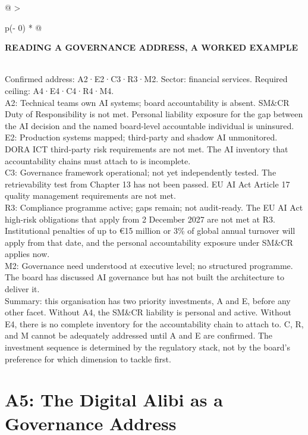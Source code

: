 \begin{longtable}[]{@{}
  >{\raggedright\arraybackslash}p{(\columnwidth - 0\tabcolsep) * }@{}}
\toprule\noalign{}
\begin{minipage}[b]{\linewidth}\raggedright
\textbf{READING A GOVERNANCE ADDRESS, A WORKED EXAMPLE}
\end{minipage} \\
\midrule\noalign{}
\endhead
\bottomrule\noalign{}
\endlastfoot
Confirmed address: A2·E2·C3·R3·M2. Sector: financial services. Required ceiling: A4·E4·C4·R4·M4. \\
A2: Technical teams own AI systems; board accountability is absent. SM\&CR Duty of Responsibility is not met. Personal liability exposure for the gap between the AI decision and the named board-level accountable individual is uninsured. \\
E2: Production systems mapped; third-party and shadow AI unmonitored. DORA ICT third-party risk requirements are not met. The AI inventory that accountability chains must attach to is incomplete. \\
C3: Governance framework operational; not yet independently tested. The retrievability test from Chapter 13 has not been passed. EU AI Act Article 17 quality management requirements are not met. \\
R3: Compliance programme active; gaps remain; not audit-ready. The EU AI Act high-risk obligations that apply from 2 December 2027 are not met at R3. Institutional penalties of up to €15 million or 3\% of global annual turnover will apply from that date, and the personal accountability exposure under SM\&CR applies now. \\
M2: Governance need understood at executive level; no structured programme. The board has discussed AI governance but has not built the architecture to deliver it. \\
Summary: this organisation has two priority investments, A and E, before any other facet. Without A4, the SM\&CR liability is personal and active. Without E4, there is no complete inventory for the accountability chain to attach to. C, R, and M cannot be adequately addressed until A and E are confirmed. The investment sequence is determined by the regulatory stack, not by the board's preference for which dimension to tackle first. \\
\end{longtable}

\scenebreak

\section{A5: The Digital Alibi as a Governance Address}

